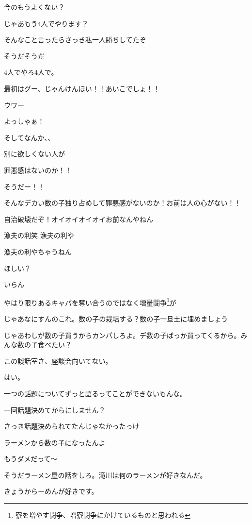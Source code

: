 \begin{multicols}{3}
今のもうよくない？

じゃあもう4人でやります？

そんなこと言ったらさっき私一人勝ちしてたぞ

そうだそうだ

4人でやろ4人で。

最初はグー、じゃんけんほい！！あいこでしょ！！

ウワー

よっしゃぁ！

そしてなんか、、

別に欲しくない人が

罪悪感はないのか！！

そうだー！！

そんなデカい数の子独り占めして罪悪感がないのか！お前は人の心がない！！

自治破壊だぞ！オイオイオイオイお前なんやねん

漁夫の利笑 漁夫の利や

漁夫の利やちゃうねん

ほしい？

いらん

やはり限りあるキャパを奪い合うのではなく増量闘争\footnote{寮を増やす闘争、増寮闘争にかけているものと思われる}が

じゃあなにすんのこれ。数の子の栽培する？数の子一旦土に埋めましょう

じゃあわしが数の子買うからカンパしろよ。デ数の子ばっか買ってくるから。みんな数の子食べたい？

この談話室さ、座談会向いてない。

はい。

一つの話題についてずっと語るってことができないもんな。

一回話題決めてからにしません？

さっき話題決められてたんじゃなかったっけ

ラーメンから数の子になったんよ

もうダメだって～

そうだラーメン屋の話をしろ。滝川は何のラーメンが好きなんだ。

きょうからーめんが好きです。


\end{multicols}
